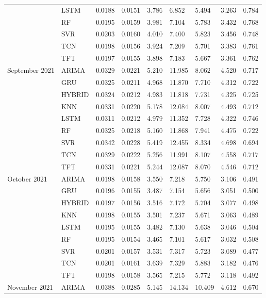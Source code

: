\begin{tabular}{lllllllll}
 & LSTM & 0.0188 & 0.0151 & 3.786 & 6.852 & 5.494 & 3.263 & 0.784 \\
 & RF & 0.0195 & 0.0159 & 3.981 & 7.104 & 5.783 & 3.432 & 0.768 \\
 & SVR & 0.0203 & 0.0160 & 4.010 & 7.400 & 5.823 & 3.456 & 0.748 \\
 & TCN & 0.0198 & 0.0156 & 3.924 & 7.209 & 5.701 & 3.383 & 0.761 \\
 & TFT & 0.0197 & 0.0155 & 3.898 & 7.183 & 5.667 & 3.361 & 0.762 \\
September 2021 & ARIMA & 0.0329 & 0.0221 & 5.210 & 11.985 & 8.062 & 4.520 & 0.717 \\
 & GRU & 0.0325 & 0.0211 & 4.968 & 11.870 & 7.710 & 4.312 & 0.722 \\
 & HYBRID & 0.0324 & 0.0212 & 4.983 & 11.818 & 7.731 & 4.325 & 0.725 \\
 & KNN & 0.0331 & 0.0220 & 5.178 & 12.084 & 8.007 & 4.493 & 0.712 \\
 & LSTM & 0.0311 & 0.0212 & 4.979 & 11.352 & 7.728 & 4.322 & 0.746 \\
 & RF & 0.0325 & 0.0218 & 5.160 & 11.868 & 7.941 & 4.475 & 0.722 \\
 & SVR & 0.0342 & 0.0228 & 5.419 & 12.455 & 8.334 & 4.698 & 0.694 \\
 & TCN & 0.0329 & 0.0222 & 5.256 & 11.991 & 8.107 & 4.558 & 0.717 \\
 & TFT & 0.0331 & 0.0221 & 5.244 & 12.087 & 8.070 & 4.546 & 0.712 \\
October 2021 & ARIMA & 0.0198 & 0.0158 & 3.550 & 7.218 & 5.750 & 3.106 & 0.491 \\
 & GRU & 0.0196 & 0.0155 & 3.487 & 7.154 & 5.656 & 3.051 & 0.500 \\
 & HYBRID & 0.0197 & 0.0156 & 3.516 & 7.172 & 5.704 & 3.077 & 0.498 \\
 & KNN & 0.0198 & 0.0155 & 3.501 & 7.237 & 5.671 & 3.063 & 0.489 \\
 & LSTM & 0.0195 & 0.0155 & 3.482 & 7.130 & 5.638 & 3.046 & 0.504 \\
 & RF & 0.0195 & 0.0154 & 3.465 & 7.101 & 5.617 & 3.032 & 0.508 \\
 & SVR & 0.0201 & 0.0157 & 3.531 & 7.317 & 5.723 & 3.089 & 0.477 \\
 & TCN & 0.0201 & 0.0161 & 3.639 & 7.329 & 5.883 & 3.182 & 0.476 \\
 & TFT & 0.0198 & 0.0158 & 3.565 & 7.215 & 5.772 & 3.118 & 0.492 \\
November 2021 & ARIMA & 0.0388 & 0.0285 & 5.145 & 14.134 & 10.409 & 4.612 & 0.670 \\

\end{tabular}
